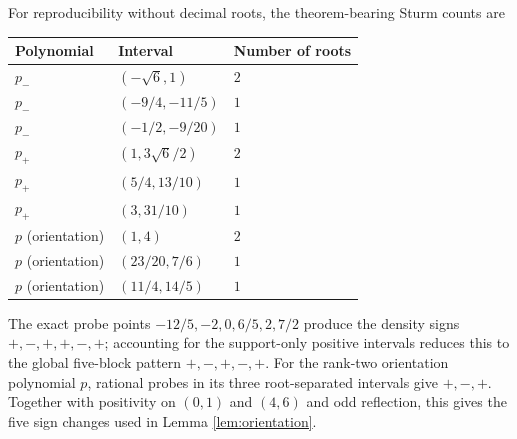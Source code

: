 \documentclass[11pt]{article}
\begin{document}
For reproducibility without decimal roots, the theorem-bearing Sturm counts
are
\begin{center}
\begin{tabular}{@{}lll@{}}
\toprule
Polynomial & Interval & Number of roots\\
\midrule
$p_-$ & $(-\sqrt6,1)$ & $2$\\
$p_-$ & $(-9/4,-11/5)$ & $1$\\
$p_-$ & $(-1/2,-9/20)$ & $1$\\
$p_+$ & $(1,3\sqrt6/2)$ & $2$\\
$p_+$ & $(5/4,13/10)$ & $1$\\
$p_+$ & $(3,31/10)$ & $1$\\
$p$ (orientation) & $(1,4)$ & $2$\\
$p$ (orientation) & $(23/20,7/6)$ & $1$\\
$p$ (orientation) & $(11/4,14/5)$ & $1$\\
\bottomrule
\end{tabular}
\end{center}
The exact probe points $-12/5,-2,0,6/5,2,7/2$ produce the density signs
$+,-,+,+,-,+$; accounting for the support-only positive intervals reduces
this to the global five-block pattern $+,-,+,-,+$.
For the rank-two orientation polynomial $p$, rational probes in its three
root-separated intervals give $+,-,+$.  Together with positivity on
$(0,1)$ and $(4,6)$ and odd reflection, this gives the five sign changes
used in Lemma \ref{lem:orientation}.

\printbibliography
\end{document}
